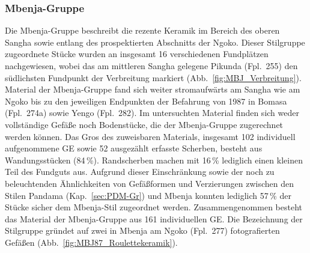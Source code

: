 \subsubsection{Mbenja-Gruppe}\label{sec:MBJ-Gr}

Die Mbenja-Gruppe beschreibt die rezente Keramik im Bereich des oberen \mbox{Sangha} sowie entlang des prospektierten Abschnitts der \mbox{Ngoko}. Dieser Stilgruppe zugeordnete Stücke wurden an insgesamt 16 verschiedenen Fundplätzen nachgewiesen, wobei das am mittleren \mbox{Sangha} gelegene Pikunda (Fpl.~255) den südlichsten Fundpunkt der Verbreitung markiert (Abb.~\ref{fig:MBJ_Verbreitung}). Material der Mbenja-Gruppe fand sich weiter stromaufwärts am \mbox{Sangha} wie am \mbox{Ngoko} bis zu den jeweiligen Endpunkten der Befahrung von 1987 in Bomasa (Fpl.~274a) sowie Yengo (Fpl.~282). Im untersuchten Material finden sich weder vollständige Gefäße noch Bodenstücke, die der Mbenja-Gruppe zugerechnet werden können. Das Gros des zuweisbaren Materials, insgesamt 102 individuell aufgenommene GE sowie 52 ausgezählt erfasste Scherben, besteht aus Wandungsstücken (84\,\%).  Randscherben machen mit 16\,\% lediglich einen kleinen Teil des Fundguts aus. Aufgrund dieser Einschränkung sowie der noch zu beleuchtenden Ähnlichkeiten von Gefäßformen und Verzierungen zwischen den Stilen Pandama (Kap.~\ref{sec:PDM-Gr}) und Mbenja konnten lediglich 57\,\% der Stücke sicher dem Mbenja-Stil zugeordnet werden. Zusammengenommen besteht das Material der Mbenja-Gruppe aus 161 individuellen GE. Die Bezeichnung der Stilgruppe gründet auf zwei in Mbenja am \mbox{Ngoko} (Fpl.~277) fotografierten Gefäßen (Abb.~\ref{fig:MBJ87_Roulettekeramik}). 


